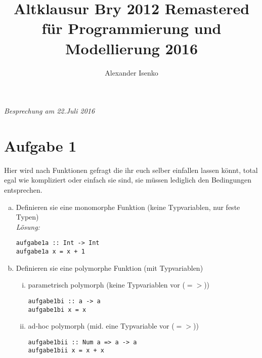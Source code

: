 \documentclass{article}
\title{Altklausur Bry 2012 Remastered für Programmierung und Modellierung 2016}
\author{Alexander Isenko}
\begin{document}
\maketitle

\begin{center}
\textit{Besprechung am 22.Juli 2016}
\end{center}

\section*{Aufgabe 1}
Hier wird nach Funktionen gefragt die ihr euch selber einfallen lassen könnt, total egal wie kompliziert
oder einfach sie sind, sie müssen lediglich den Bedingungen entsprechen.
\begin{enumerate} [a)]
    \setlength\itemsep{3em}
    \item  Definieren sie eine monomorphe Funktion (keine Typvariablen, nur feste Typen) \\

    \textit{Lösung:}
    \begin{mdframed}[backgroundcolor=bg]
        \begin{verbatim}
aufgabe1a :: Int -> Int
aufgabe1a x = x + 1
        \end{verbatim}
    \end{mdframed}

    \item Definieren sie eine polymorphe Funktion (mit Typvariablen)

        \begin{enumerate}[i)]
        \setlength\itemsep{3em}
            \item parametrisch polymorph  (keine Typvariablen vor ($=>$)) \\
                \begin{mdframed}[backgroundcolor=bg]
                    \begin{verbatim}
aufgabe1bi :: a -> a
aufgabe1bi x = x
                    \end{verbatim}
                \end{mdframed}
            \item ad-hoc polymorph       (mid. eine Typvariable vor ($=>$)) \\
                \begin{mdframed}[backgroundcolor=bg]
                    \begin{verbatim}
aufgabe1bii :: Num a => a -> a
aufgabe1bii x = x + x
                    \end{verbatim}
                \end{mdframed}
        \end{enumerate}


\end{enumerate}
\end{document}
